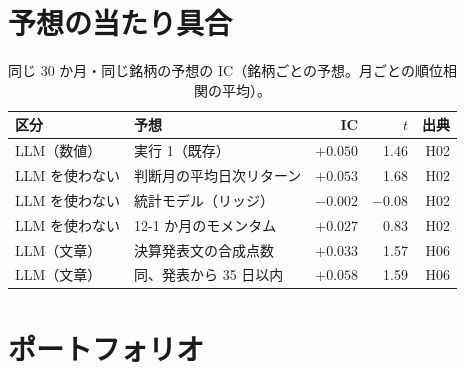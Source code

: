 \documentclass[xelatex,ja=standard,jafont=haranoaji,a4paper,10pt,openany]{bxjsreport}
\begin{document}
\section{予想の当たり具合}

\begin{table}[htbp]
\centering
\caption{同じ 30 か月・同じ銘柄の予想の IC（銘柄ごとの予想。月ごとの順位相関の平均）。}
\small
\begin{tabular}{llrrr}
\toprule
区分 & 予想 & IC & $t$ & 出典 \\
\midrule
LLM（数値） & 実行 1（既存） & $+0.050$ & 1.46 & H02 \\
LLM を使わない & 判断月の平均日次リターン & $+0.053$ & 1.68 & H02 \\
LLM を使わない & 統計モデル（リッジ） & $-0.002$ & $-0.08$ & H02 \\
LLM を使わない & 12-1 か月のモメンタム & $+0.027$ & 0.83 & H02 \\
LLM（文章） & 決算発表文の合成点数 & $+0.033$ & 1.57 & H06 \\
LLM（文章） & 同、発表から 35 日以内 & $+0.058$ & 1.59 & H06 \\
\bottomrule
\end{tabular}
\end{table}

\section{ポートフォリオ}
\end{document}
